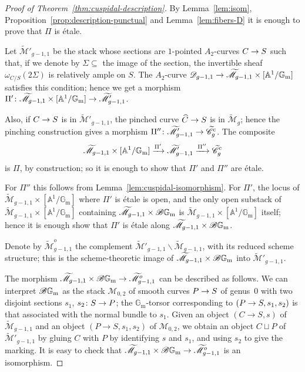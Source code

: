 \documentclass[a4paper, 10pt]{amsart}
\numberwithin{equation}{section}
\numberwithin{subsection}{section}
\theoremstyle{definition}
\theoremstyle{remark}
\renewcommand{\mathcal}{\mathscr}
\newcommand\cM{\mathcal{M}} \newcommand\cN{\mathcal{N}}
\renewcommand\AA{\mathbb{A}} \newcommand\BB{\mathbb{B}}
\newcommand\GG{\mathbb{G}} \newcommand\HH{\mathbb{H}}
\newcommand\rmm{\mathrm{m}} \newcommand\rmn{\mathrm{n}}
\newcommand\arr{\ifinner\to\else\longrightarrow\fi}
\newcommand{\xarr}{\xrightarrow}
\renewcommand{\setminus}{\smallsetminus}
\newcommand{\gm}{\GG_{\rmm}}
\newcommand{\Ctilde}{\widetilde{\mathcal C}}
\newcommand{\cu}{^{\rm c}}
\newcommand{\ag}{[\AA^{1}/\gm]}
\newcommand{\mt}{\widetilde{\mathcal M}}
\begin{document}
	\begin{proof}[Proof of Theorem~\ref{thm:cuspidal-description}]
	By Lemma~\ref{lem:isom}, Proposition~\ref{prop:description-punctual} and Lemma~\ref{lem:fibers-D} it is enough to prove that $\Pi$ is \'{e}tale. 

Let $\mt'_{g-1, 1}$ be the stack whose sections are $1$-pointed $A_{2}$-curves $C \arr S$ such that, if we denote by $\Sigma \subseteq$ the image of the section, the invertible sheaf $\omega_{C/S}(2\Sigma)$ is relatively ample on $S$. The $A_{2}$-curve $\cD_{g-1,1} \arr \mt_{g-1,1}\times \ag$ satisfies this condition; hence we get a morphism $\Pi'\colon \mt_{g-1,1}\times \ag \arr \mt'_{g-1, 1}$. 

Also, if $C \arr S$ is in $\mt'_{g-1, 1}$, the pinched curve $\widehat{C} \arr S$ is in $\mt_{g}$; hence the pinching construction gives a morphism $\Pi''\colon \mt'_{g-1, 1} \arr \Ctilde_{g}\cu$. The composite
   \[
   \mt_{g-1,1}\times \ag \xarr{\Pi'} \mt'_{g-1,1} \xarr{\Pi''} \Ctilde_{g}\cu
   \]
is $\Pi$, by construction; so it is enough to show that $\Pi'$ and $\Pi''$ are \'{e}tale.

For $\Pi''$ this follows from Lemma~\ref{lem:cuspidal-isomorphism}. For $\Pi'$, the locus of $\mt_{g-1,1}\times \ag$ where $\Pi'$ is \'{e}tale is open, and the only open substack of $\mt_{g-1,1}\times \ag$ containing $\mt_{g-1,1}\times \cB\gm$ is $\mt_{g-1,1}\times \ag$ itself; hence it is enough show that $\Pi'$ is \'{e}tale along $\mt_{g-1,1}\times \cB\gm$.

Denote by $\mt^{o}_{g-1,1}$ the complement $\mt'_{g-1,1} \setminus \mt_{g-1,1}$, with its reduced scheme structure; this is the scheme-theoretic image of $\mt_{g-1,1}\times \cB\gm$ into $\mt'_{g-1,1}$.

The morphism $\mt_{g-1,1}\times \cB\gm \arr \mt^{o}_{g-1,1}$ can be described as follows. We can interpret $\cB\gm$ as the stack $\cM_{0,2}$ of smooth curves $P \arr S$ of genus~$0$ with two disjoint sections $s_{1}$, $s_{2}\colon S \arr P$; the $\gm$-torsor corresponding to $(P \arr S, s_{1}, s_{2})$ is that associated with the normal bundle to $s_{1}$. Given an object $(C \to S, s)$ of $\mt_{g-1,1}$ and an object $(P \to S, s_{1}, s_{2})$ of $\cM_{0,2}$, we obtain an object $C \sqcup P$ of $\mt'_{g-1,1}$ by gluing $C$ with $P$ by identifying $s$ and $s_{1}$, and using $s_{2}$ to give the marking. It is easy to check that $\mt_{g-1,1}\times \cB\gm \arr \mt^{o}_{g-1,1}$ is an isomorphism. 


\end{proof}
\end{document}
